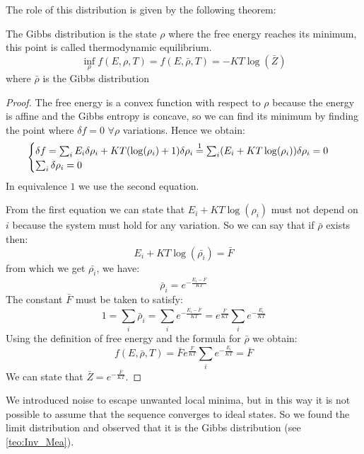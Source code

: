 \noindent The role of this distribution is given by the following theorem:
\begin{theorem}
     \label{teo:Gibbs}
     The Gibbs distribution is the state $\rho$ where the free energy reaches its minimum, this point is called thermodynamic equilibrium.
     \[
      \inf_\rho f(E,\rho,T) = f(E,\bar{\rho},T) = -K T \log(\bar{Z})
     \]
    where $\bar{\rho}$ is the Gibbs distribution
    \begin{proof}
        The free energy is a convex function with respect to $\rho$ because the energy is affine and the Gibbs entropy is concave, so we can find its minimum by finding the point where $\delta f = 0$ $\forall \rho$ variations.
        Hence we obtain:
        \[
        \begin{cases}
            \delta f = \sum_i E_i\delta\rho_i  + KT(\log(\rho_i)+1)\delta\rho_i \overset{1}{=} \sum_i (E_i + KT\log(\rho_i))\delta\rho_i = 0 \\
            \sum_i \delta\rho_i = 0
        \end{cases}
        \]
        In equivalence $1$ we use the second equation.

        \noindent From the first equation we can state that $E_i + KT\log(\rho_i)$ must not depend on $i$ because the system must hold for any variation. So we can say that if $\bar{\rho}$ exists then:
        \[
        E_i + KT\log(\bar{\rho_i}) = \bar{F}
        \]
        from which we get $\bar{\rho_i}$, we have:
        \[
        \bar{\rho}_i = e^{-\frac{E_i-\bar{F}}{KT}}
        \]
        The constant $\bar{F}$ must be taken to satisfy:
        \[
         1=\sum_i \bar{\rho}_i = \sum_i e^{-\frac{E_i-\bar{F}}{KT}} = e^{\frac{\bar{F}}{KT}}\sum_i e^{-\frac{E_i}{KT}}
        \]
        \noindent Using the definition of free energy and the formula for $\bar{\rho}$ we obtain:
        \begin{equation}
            f(E,\bar{\rho},T) = \bar{F}e^{\frac{\bar{F}}{KT}}\sum_i e^{-\frac{E_i}{KT}} = \bar{F}
        \end{equation}
        We can state that $\bar{Z} = e^{-\frac{\bar{F}}{KT}}$.
    \end{proof}
\end{theorem}

\bigskip\noindent We introduced noise to escape unwanted local minima, but in this way it is not possible to assume that the sequence converges to ideal states. So we found the limit distribution and observed that it is the Gibbs distribution (see \cref{teo:Inv_Mea}).

